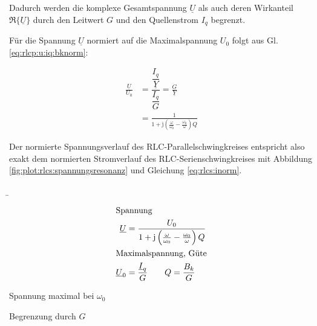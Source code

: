 \begin{frame}
{    Dadurch werden die komplexe Gesamtspannung $\underline{U}$ als auch deren Wirkanteil $\Re\{\underline{U}\}$ 
    durch den Leitwert $G$ und den Quellenstrom $I_q$ begrenzt.

    Für die Spannung $\underline{U}$ normiert auf die Maximalspannung $U_0$ folgt aus Gl. \ref{eq:rlcp:u:iq:bknorm}:

    \begin{equation}\label{eq:rlcp:unorm}
        \begin{aligned}
            \frac{\underline{U}}{U_0} 
            &= \dfrac{\dfrac{I_q}{\underline{Y}}}{\dfrac{I_q}{G}} 
            =  \frac{G}{\underline{Y}}\\
            &= \frac{1}{1 + \mathrm{j} \left(\frac{\omega}{\omega_0} - \frac{\omega_0}{\omega}\right) Q}
        \end{aligned}
    \end{equation}

    Der normierte Spannungsverlauf des RLC-Parallelschwingkreises entspricht also 
    exakt dem normierten Stromverlauf des RLC-Serienschwingkreises mit Abbildung \ref{fig:plot:rlcs:spannungsresonanz}
    und Gleichung \ref{eq:rlcs:inorm}.
}%
\b{%
    \begin{minipage}{0.3\textwidth}%
    \begin{align}
        \intertext{Spannung}
        \underline{U} &= \frac{U_0}{1 + \mathrm{j}\left(\frac{\omega}{\omega_0} - \frac{\omega_0}{\omega}\right)Q}\\
        \intertext{Maximalspannung, Güte}
        \underline{U}_0 &= \frac{\underline{I}_q}{G}
        \qquad Q = \frac{B_k}{G}        
    \end{align}
    \end{minipage}\hfill%
    \begin{minipage}{0.65\textwidth}\centering
        \newline
        Spannung maximal bei $\omega_0$

        Begrenzung durch $G$
    \end{minipage}
}
\end{frame}

